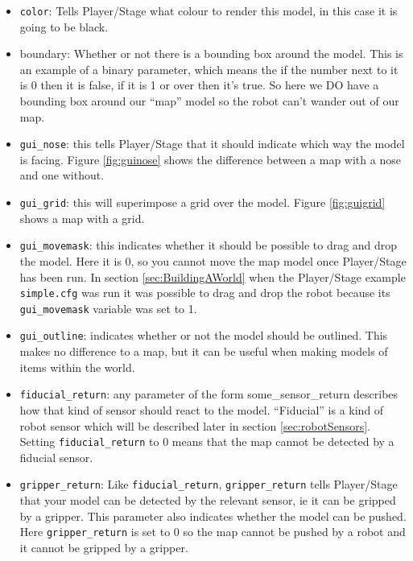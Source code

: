 \documentclass[a4paper]{article}
\newcommand{\plst}{Player/Stage\xspace}
\begin{document}
\begin{itemize}
\item \verb|color|: Tells \plst what colour to render this model, in this case it is going to be black. 
\item boundary: Whether or not there is a bounding box around the model. This is an example of a binary parameter, which means the if the number next to it is 0 then it is false, if it is 1 or over then it's true. So here we DO have a bounding box around our ``map'' model so the robot can't wander out of our map.
\item \verb|gui_nose|: this tells \plst that it should indicate which way the model is facing. Figure \ref{fig:guinose} shows the difference between a map with a nose and one without.
\item \verb|gui_grid|: this will superimpose a grid over the model. Figure \ref{fig:guigrid} shows a map with a grid.
\item \verb|gui_movemask|: this indicates whether it should be possible to drag and drop the model. Here it is 0, so you cannot move the map model once \plst has been run. In section \ref{sec:BuildingAWorld} when the \plst example \verb|simple.cfg| was run it was possible to drag and drop the robot because its \verb|gui_movemask| variable was set to 1.
\item \verb|gui_outline|: indicates whether or not the model should be outlined. This makes no difference to a map, but it can be useful when making models of items within the world.


\item \verb|fiducial_return|: any parameter of the form some\_sensor\_return describes how that kind of sensor should react to the model. ``Fiducial'' is a kind of robot sensor which will be described later in section \ref{sec:robotSensors}. Setting \verb|fiducial_return| to 0 means that the map cannot be detected by a fiducial sensor.
\item \verb|gripper_return|: Like \verb|fiducial_return|, \verb|gripper_return| tells \plst that your model can be detected by the relevant sensor, ie it can be gripped by a gripper. This parameter also indicates whether the model can be pushed. Here \verb|gripper_return| is set to 0 so the map cannot be pushed by a robot and it cannot be gripped by a gripper.
\end{itemize}
\end{document}
